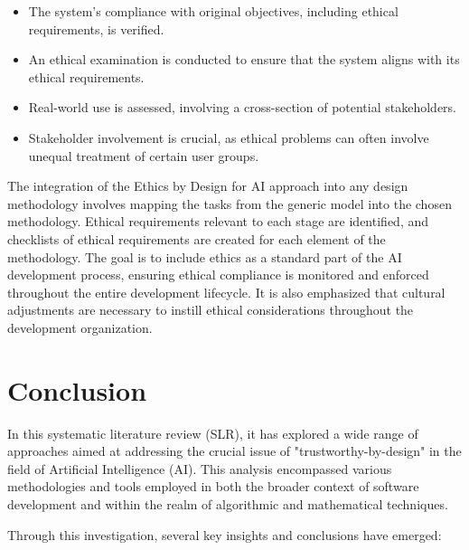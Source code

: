 \documentclass{article}
\begin{document}
\begin{itemize}

    \item The system's compliance with original objectives, including ethical requirements, is verified.

    \item An ethical examination is conducted to ensure that the system aligns with its ethical requirements.

    \item Real-world use is assessed, involving a cross-section of potential stakeholders.

    \item Stakeholder involvement is crucial, as ethical problems can often involve unequal treatment of certain user groups.

\end{itemize}

The integration of the Ethics by Design for AI approach into any design methodology involves mapping the tasks from the generic model into the chosen methodology. Ethical requirements relevant to each stage are identified, and checklists of ethical requirements are created for each element of the methodology. The goal is to include ethics as a standard part of the AI development process, ensuring ethical compliance is monitored and enforced throughout the entire development lifecycle. It is also emphasized that cultural adjustments are necessary to instill ethical considerations throughout the development organization.

\newpage
\section{Conclusion}

In this systematic literature review (SLR), it has explored a wide range of approaches aimed at addressing the crucial issue of "trustworthy-by-design" in the field of Artificial Intelligence (AI). This analysis encompassed various methodologies and tools employed in both the broader context of software development and within the realm of algorithmic and mathematical techniques.  

Through this investigation, several key insights and conclusions have emerged:
\end{document}
